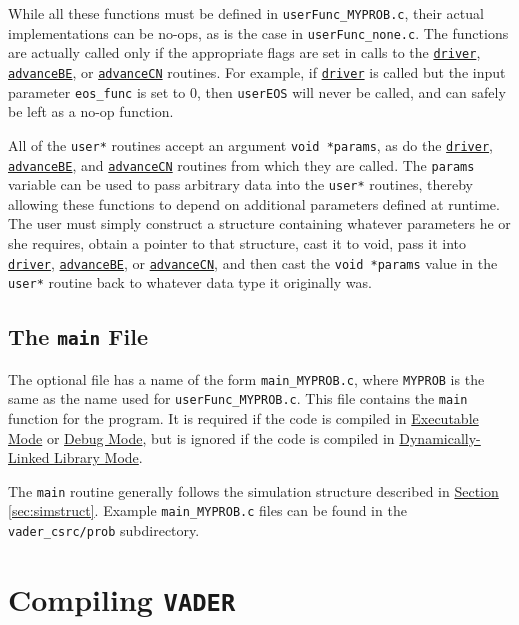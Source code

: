 \documentclass[12pt]{article}
\begin{document}
While all these functions must be defined in \verb=userFunc_MYPROB.c=, their actual implementations can be no-ops, as is the case in \verb=userFunc_none.c=. The functions are actually called only if the appropriate flags are set in calls to the \hyperref[sssec:driver]{\texttt{driver}}, \hyperref[sssec:advanceBE]{\texttt{advanceBE}}, or \hyperref[sssec:advanceCN]{\texttt{advanceCN}} routines. For example, if \hyperref[sssec:driver]{\texttt{driver}} is called but the input parameter \verb=eos_func= is set to 0, then \texttt{userEOS} will never be called, and can safely be left as a no-op function.

All of the \verb=user*= routines accept an argument \verb=void *params=, as do the \hyperref[sssec:driver]{\texttt{driver}},  \hyperref[sssec:advanceBE]{\texttt{advanceBE}}, and  \hyperref[sssec:advanceCN]{\texttt{advanceCN}} routines from which they are called. The \verb=params= variable can be used to pass arbitrary data into the \verb=user*= routines, thereby allowing these functions to depend on additional parameters defined at runtime. The user must simply construct a structure containing whatever parameters he or she requires, obtain a pointer to that structure, cast it to void, pass it into \hyperref[sssec:driver]{\texttt{driver}},  \hyperref[sssec:advanceBE]{\texttt{advanceBE}}, or \hyperref[sssec:advanceCN]{\texttt{advanceCN}}, and then cast the \verb=void *params= value in the \verb=user*= routine back to whatever data type it originally  was.


\subsection{The \texttt{main} File}

The optional file has a name of the form \verb=main_MYPROB.c=, where \texttt{MYPROB} is the same as the name used for \verb=userFunc_MYPROB.c=. This file contains the \texttt{main} function for the program. It is required if the code is compiled in \hyperref[ssec:exemode]{Executable Mode} or \hyperref[ssec:debugmode]{Debug Mode}, but is ignored if the code is compiled in \hyperref[ssec:dylibmode]{Dynamically-Linked Library Mode}.

The \verb=main= routine generally follows the simulation structure described in \hyperref[sec:simstruct]{Section \ref{sec:simstruct}}. Example \verb=main_MYPROB.c= files can be found in the \verb=vader_csrc/prob= subdirectory.


\section{Compiling \texttt{VADER}}
\end{document}
